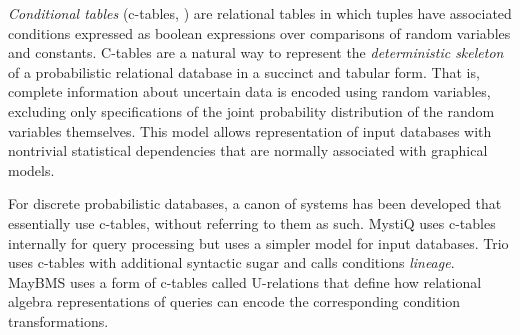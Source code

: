 {\em  Conditional tables}\/  (c-tables, \cite{IL1984})  are relational tables in which tuples have associated conditions expressed as boolean expressions over  comparisons of random variables  and constants. C-tables are a natural way to  represent  the  {\em  deterministic skeleton}\/  of a probabilistic relational  database in  a succinct  and tabular  form.  That  is, complete information  about uncertain data is encoded using random  variables, excluding only  specifications  of the  joint  probability  distribution of  the random  variables   themselves.   This  model   allows  representation of  input databases  with  nontrivial statistical  dependencies that are normally associated with graphical models. 

For discrete probabilistic  databases, a canon of systems has been developed that essentially use c-tables, without referring to them as such. MystiQ  \cite{dalvi07efficient}  uses  c-tables internally  for  query processing  but  uses  a  simpler  model for  input  databases.   Trio \cite{WidomTrio2008}  uses  c-tables with  additional  syntactic sugar  and calls conditions {\em lineage}\/.  MayBMS \cite{AJKO2008}  uses a  form of  c-tables called  U-relations that define how relational algebra representations of queries can encode the corresponding condition transformations.


